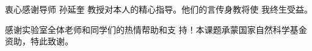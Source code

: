 \begin{acknowledgement}
  衷心感谢导师 孙延奎 教授对本人的精心指导。他们的言传身教将使
  我终生受益。

  感谢实验室全体老师和同学们的热情帮助和支
  持！本课题承蒙国家自然科学基金资助，特此致谢。

  
  \end{acknowledgement}
